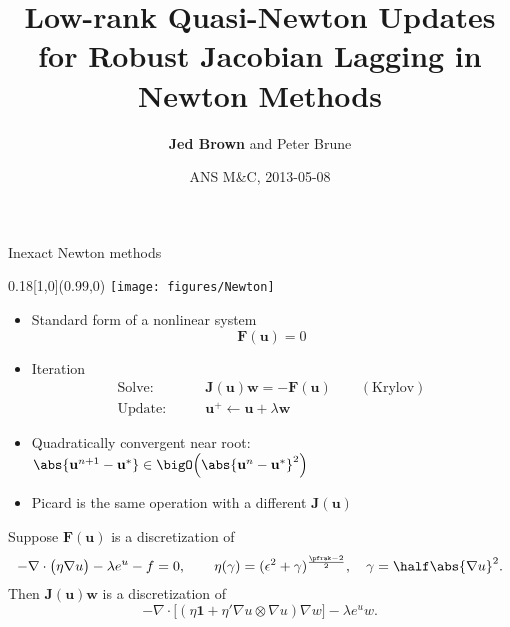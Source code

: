 \documentclass{beamer}
\title{Low-rank Quasi-Newton Updates for Robust Jacobian Lagging in Newton Methods}
\author{{\bf Jed Brown} and Peter Brune}
\institute
{
  {Mathematics and Computer Science Division, Argonne National Laboratory}
}
\date{ANS M\&C, 2013-05-08}
\newcommand{\vu}{\mathbf{u}}
\newcommand{\vw}{\mathbf{w}}
\newcommand{\vF}{\mathbf{F}}
\newcommand{\vJ}{\mathbf{J}}
\begin{document}
\lstset{language=C}
\normalem

\begin{frame}
  \titlepage
\end{frame}




\begin{frame}{Inexact Newton methods}
  \begin{textblock}{0.18}[1,0](0.99,0)
    \texttt{[image: figures/Newton]}
  \end{textblock}
  \begin{itemize}
  \item Standard form of a nonlinear system
    \[ \vF(\vu) = 0 \]
  \item Iteration
    \begin{align*}
      \text{Solve:} & \qquad \vJ(\vu) \vw = -\vF(\vu) \qquad (\text{Krylov}) \\
      \text{Update:} & \qquad \vu^+ \gets \vu + \lambda \vw
    \end{align*}
    \item Quadratically convergent near root: $\abs{\vu^{n+1}-\vu^*} \in \bigO\Big(\abs{\vu^n-\vu^*}^2\Big)$
    \item Picard is the same operation with a different $\vJ(\vu)$
  \end{itemize}
  \begin{example}
    Suppose $\vF(\vu)$ is a discretization of \vspace{-1em}
    \[ -\nabla \cdot \big( \eta \nabla u \big) - \lambda e^u - f = 0, \qquad \eta(\gamma) = (\epsilon^2+\gamma)^{\frac{\pfrak-2}{2}}, \quad \gamma = \half \abs{\nabla u}^2 . \]
    Then $\vJ(\vu)\vw$ is a discretization of  \vspace{-1em}
    \[ -\nabla \cdot \big[ (\eta \bm 1 + \eta' \nabla u \otimes \nabla u) \nabla w \big] - \lambda e^{u} w . \]
  \end{example}
\end{frame}
\end{document}
